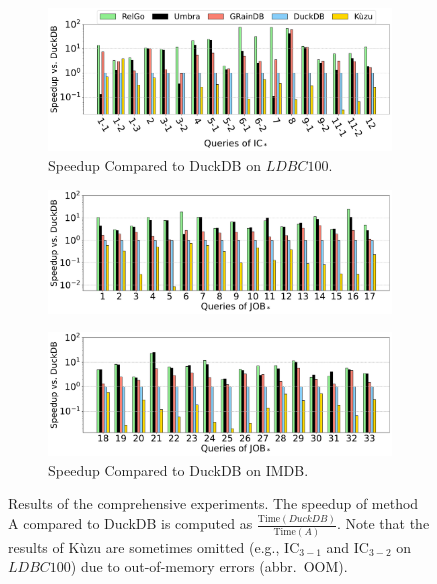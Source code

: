 \begin{figure}[ht]
    \centering
    \begin{subfigure}[b]{\linewidth}
        \centering
        \includegraphics[width=\linewidth]{./figures/exp/e2e_sf100.pdf}
        \vspace{-2em}
        \caption{Speedup Compared to DuckDB on $LDBC100$.}
        \label{fig:exp-e2e-sf100}
    \end{subfigure}
    \begin{subfigure}[b]{\linewidth}
        \centering
        \includegraphics[width=\linewidth]{./figures/exp/e2e_job_part1.pdf}
        \vspace*{-2ex}
    \end{subfigure}
    \begin{subfigure}[b]{\linewidth}
        \centering
        \includegraphics[width=\linewidth]{./figures/exp/e2e_job_part2.pdf}
        \vspace{-2em}
        \caption{Speedup Compared to DuckDB on IMDB.}
        \label{fig:exp-e2e-job}
    \end{subfigure}
    \caption{Results of the comprehensive experiments. The speedup of method A compared to DuckDB is computed as $\frac{\text{Time}(DuckDB)}{\text{Time}(A)}$. Note that the results of K\`uzu are sometimes omitted (e.g., $\text{IC}_{3-1}$ and $\text{IC}_{3-2}$ on $LDBC100$) due to out-of-memory errors (abbr.~OOM).}
    \label{fig:exp-e2e}
\end{figure}

